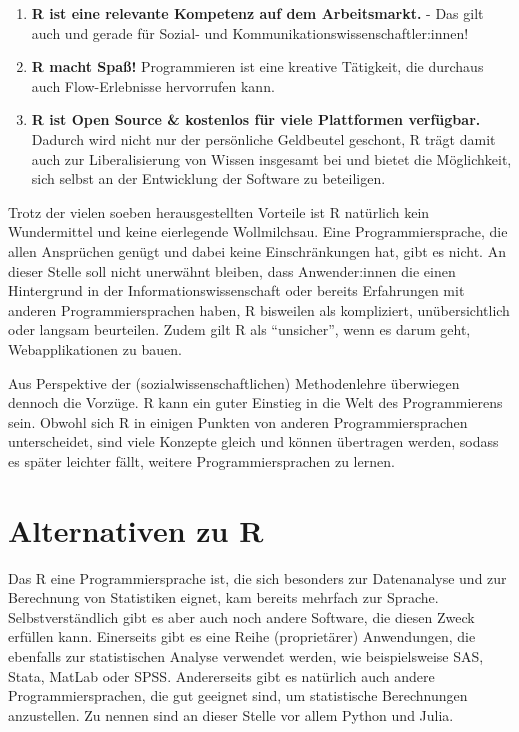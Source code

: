 \documentclass[
]{book}
\begin{document}
\begin{enumerate}
\item
  \textbf{R ist eine relevante Kompetenz auf dem Arbeitsmarkt.} - Das gilt auch und gerade für Sozial- und Kommunikationswissenschaftler:innen!
\item
  \textbf{R macht Spaß!} Programmieren ist eine kreative Tätigkeit, die durchaus auch Flow-Erlebnisse hervorrufen kann.
\item
  \textbf{R ist Open Source \& kostenlos für viele Plattformen verfügbar.} Dadurch wird nicht nur der persönliche Geldbeutel geschont, R trägt damit auch zur Liberalisierung von Wissen insgesamt bei und bietet die Möglichkeit, sich selbst an der Entwicklung der Software zu beteiligen.
\end{enumerate}

Trotz der vielen soeben herausgestellten Vorteile ist R natürlich kein Wundermittel und keine eierlegende Wollmilchsau. Eine Programmiersprache, die allen Ansprüchen genügt und dabei keine Einschränkungen hat, gibt es nicht. An dieser Stelle soll nicht unerwähnt bleiben, dass Anwender:innen die einen Hintergrund in der Informationswissenschaft oder bereits Erfahrungen mit anderen Programmiersprachen haben, R bisweilen als kompliziert, unübersichtlich oder langsam beurteilen. Zudem gilt R als ``unsicher'', wenn es darum geht, Webapplikationen zu bauen.

Aus Perspektive der (sozialwissenschaftlichen) Methodenlehre überwiegen dennoch die Vorzüge.
R kann ein guter Einstieg in die Welt des Programmierens sein. Obwohl sich R in einigen Punkten von anderen Programmiersprachen unterscheidet, sind viele Konzepte gleich und können übertragen werden, sodass es später leichter fällt, weitere Programmiersprachen zu lernen.

\hypertarget{alternativen-zu-r}{%
\section{Alternativen zu R}\label{alternativen-zu-r}}

Das R eine Programmiersprache ist, die sich besonders zur Datenanalyse und zur Berechnung von
Statistiken eignet, kam bereits mehrfach zur Sprache. Selbstverständlich gibt es aber auch noch
andere Software, die diesen Zweck erfüllen kann.
Einerseits gibt es eine Reihe (proprietärer) Anwendungen, die ebenfalls zur statistischen Analyse verwendet werden, wie beispielsweise SAS, Stata, MatLab oder SPSS.
Andererseits gibt es natürlich auch andere Programmiersprachen, die gut geeignet sind, um statistische
Berechnungen anzustellen.
Zu nennen sind an dieser Stelle vor allem Python und Julia.
\end{document}

